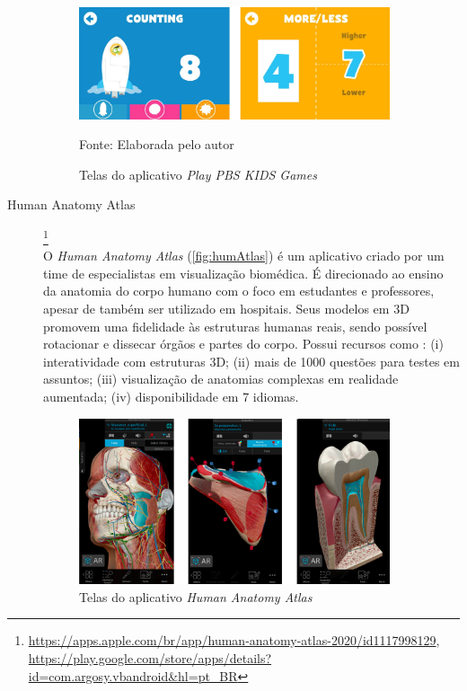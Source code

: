 \begin{description}
\begin{figure}[H]
\centering
    \caption{Telas do aplicativo \textit{Play PBS KIDS Games}}
    \label{fig:pbs}
    \includegraphics[width=0.9\textwidth]{Figuras/pbsKids.jpg}
    
    Fonte: Elaborada pelo autor
\end{figure}

\item[Human Anatomy Atlas]\footnote{\url{https://apps.apple.com/br/app/human-anatomy-atlas-2020/id1117998129}, \url{https://play.google.com/store/apps/details?id=com.argosy.vbandroid&hl=pt_BR}} \hfill \\
O \textit{Human Anatomy Atlas} (\autoref{fig:humAtlas}) é um aplicativo criado por um time de especialistas em visualização biomédica. É direcionado ao ensino da anatomia do corpo humano com o foco em estudantes e professores, apesar de também ser utilizado em hospitais. Seus modelos em 3D promovem uma fidelidade às estruturas humanas reais, sendo possível rotacionar e dissecar órgãos e partes do corpo. Possui recursos como : (i) interatividade com estruturas 3D; (ii) mais de 1000 questões para testes em assuntos; (iii) visualização de anatomias complexas em realidade aumentada; (iv) disponibilidade em 7 idiomas.

\begin{figure}[ht!]
\centering
    \caption{Telas do aplicativo \textit{Human Anatomy Atlas}}
    \label{fig:humAtlas}
    \includegraphics[width=0.9\textwidth]{Figuras/humanAtlas.png}
    

\end{figure}
\end{description}

